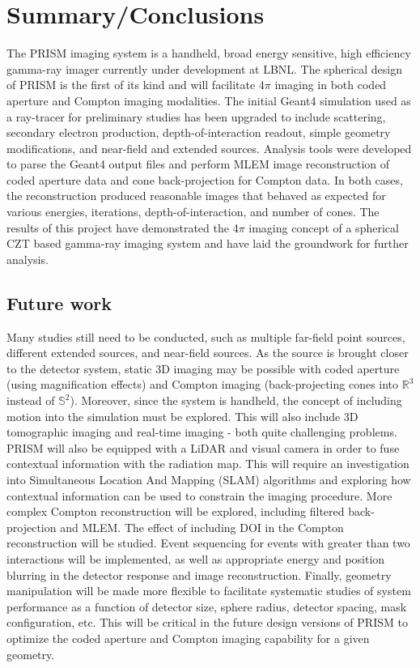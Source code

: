 \documentclass[10pt]{article}
\begin{document}
\section{Summary/Conclusions}

The PRISM imaging system is a handheld, broad energy sensitive, high efficiency gamma-ray imager currently under development at LBNL. The spherical design of PRISM is the first of its kind and will facilitate 4$\pi$ imaging in both coded aperture and Compton imaging modalities. The initial Geant4 simulation used as a ray-tracer for preliminary studies has been upgraded to include scattering, secondary electron production, depth-of-interaction readout, simple geometry modifications, and near-field and extended sources. Analysis tools were developed to parse the Geant4 output files and perform MLEM image reconstruction of coded aperture data and cone back-projection for Compton data. In both cases, the reconstruction produced reasonable images that behaved as expected for various energies, iterations, depth-of-interaction, and number of cones. The results of this project have demonstrated the 4$\pi$ imaging concept of a spherical CZT based gamma-ray imaging system and have laid the groundwork for further analysis.


\subsection{Future work}

Many studies still need to be conducted, such as multiple far-field point sources, different extended sources, and near-field sources. As the source is brought closer to the detector system, static 3D imaging may be possible with coded aperture (using magnification effects) and Compton imaging (back-projecting cones into $\mathbb{R}^3$ instead of $\mathbb{S}^2$). Moreover, since the system is handheld, the concept of including motion into the simulation must be explored. This will also include 3D tomographic imaging and real-time imaging - both quite challenging problems. PRISM will also be equipped with a LiDAR and visual camera in order to fuse contextual information with the radiation map. This will require an investigation into Simultaneous Location And Mapping (SLAM) algorithms and exploring how contextual information can be used to constrain the imaging procedure. More complex Compton reconstruction will be explored, including filtered back-projection and MLEM. The effect of including DOI in the Compton reconstruction will be studied. Event sequencing for events with greater than two interactions will be implemented, as well as appropriate energy and position blurring in the detector response and image reconstruction. Finally, geometry manipulation will be made more flexible to facilitate systematic studies of system performance as a function of detector size, sphere radius, detector spacing, mask configuration, etc. This will be critical in the future design versions of PRISM to optimize the coded aperture and Compton imaging capability for a given geometry. 
\end{document}

